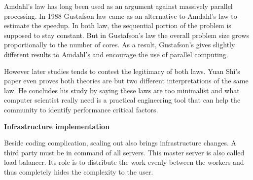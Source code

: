 Amdahl's law has long been used as an argument against massively parallel
processing. In 1988 Gustafson law came as an alternative to Amdahl's law to
estimate the speedup. In both law, the sequential portion of the problem is
supposed to stay constant. But in Gustafson's law the overall problem size
grows proportionally to the number of cores. As a result, Gustafson's gives
slightly different results to Amdahl's and encourage the use of parallel
computing.

However later studies tends to contest the legitimacy of both laws. Yuan Shi's
paper \citep{Reference9} even proves both theories are but two different
interpretations of the same law. He concludes his study by saying these laws
are too minimalist and what computer scientist really need is a practical
engineering tool that can help the community to identify performance critical
factors.

\textbf{Infrastructure implementation}

Beside coding complication, scaling out also brings infrastructure changes.
A third party must be in command of all servers. This master server is also called
load balancer. Its role is to distribute the work evenly between the workers and thus
completely hides the complexity to the user.







